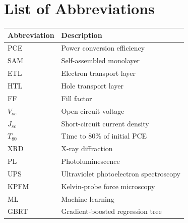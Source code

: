 \chapter*{List of Abbreviations}
\thispagestyle{plain}

\begin{center}
\renewcommand{\arraystretch}{1.3}
\begin{tabular}{@{}ll@{}}
\toprule
\textbf{Abbreviation} & \textbf{Description} \\
\midrule
PCE & Power conversion efficiency \\
SAM & Self-assembled monolayer \\
ETL & Electron transport layer \\
HTL & Hole transport layer \\
FF & Fill factor \\
$V_{oc}$ & Open-circuit voltage \\
$J_{sc}$ & Short-circuit current density \\
$T_{80}$ & Time to 80\% of initial PCE \\
XRD & X-ray diffraction \\
PL & Photoluminescence \\
UPS & Ultraviolet photoelectron spectroscopy \\
KPFM & Kelvin-probe force microscopy \\
ML & Machine learning \\
GBRT & Gradient-boosted regression tree \\
\bottomrule
\end{tabular}
\end{center}

\clearpage

